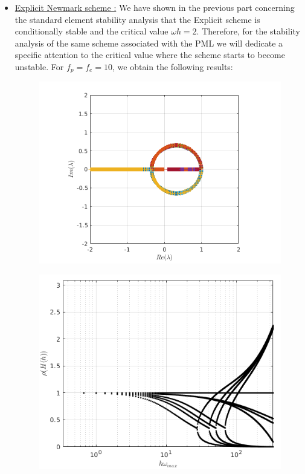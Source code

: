\begin{itemize}
\item \underline{Explicit Newmark scheme :}
We have shown in the previous part concerning the standard element stability analysis that the Explicit scheme is conditionally stable and the critical value  $\omega h = 2$. Therefore, for the stability analysis of the same scheme associated with the PML we will dedicate a specific attention to the critical value where the scheme starts to become unstable. 
For $f_p = f_e = 10$, we obtain the following results:
\begin{figure}[H]
\centering
\begin{minipage}{.5\textwidth}
  \centering
  \includegraphics[width=.99\linewidth]{images/eig_pml_exp_10.png}
  \label{fig:eig_pml_exp_10}
\end{minipage}%
\begin{minipage}{.5\textwidth}
  \centering
  \includegraphics[width=.99\linewidth]{images/spect_rad_pml_exp_10.png}

\end{minipage}
\end{figure}
\end{itemize}
